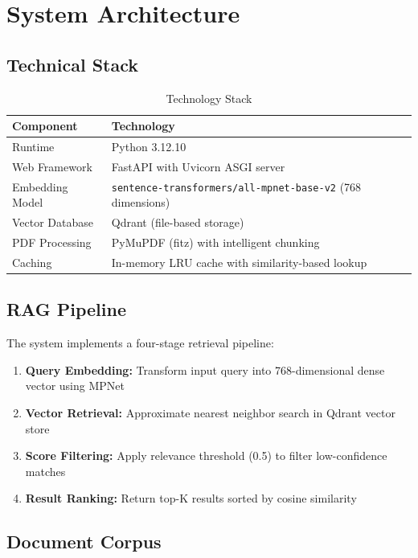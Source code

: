 \documentclass[11pt,a4paper]{article}
\begin{document}
\section{System Architecture}

\subsection{Technical Stack}

\begin{table}[H]
\centering
\begin{tabularx}{\textwidth}{lX}
\toprule
\textbf{Component} & \textbf{Technology} \\
\midrule
Runtime & Python 3.12.10 \\
Web Framework & FastAPI with Uvicorn ASGI server \\
Embedding Model & \texttt{sentence-transformers/all-mpnet-base-v2} (768 dimensions) \\
Vector Database & Qdrant (file-based storage) \\
PDF Processing & PyMuPDF (fitz) with intelligent chunking \\
Caching & In-memory LRU cache with similarity-based lookup \\
\bottomrule
\end{tabularx}
\caption{Technology Stack}
\end{table}

\subsection{RAG Pipeline}

The system implements a four-stage retrieval pipeline:

\begin{enumerate}[leftmargin=*]
    \item \textbf{Query Embedding:} Transform input query into 768-dimensional dense vector using MPNet
    \item \textbf{Vector Retrieval:} Approximate nearest neighbor search in Qdrant vector store
    \item \textbf{Score Filtering:} Apply relevance threshold (0.5) to filter low-confidence matches
    \item \textbf{Result Ranking:} Return top-K results sorted by cosine similarity
\end{enumerate}

\subsection{Document Corpus}
\end{document}
